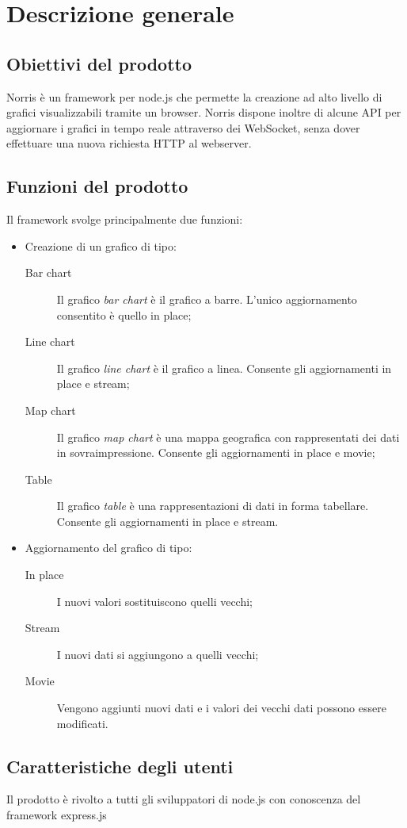 \section{Descrizione generale}


\subsection{Obiettivi del prodotto}
Norris è un framework per node.js che permette la creazione ad alto livello di grafici visualizzabili tramite un browser. Norris dispone inoltre di alcune API per aggiornare i grafici in tempo reale attraverso dei WebSocket, senza dover effettuare una nuova richiesta HTTP al webserver.


\subsection{Funzioni del prodotto}
Il framework svolge principalmente due funzioni:
\begin{itemize}
	\item Creazione di un grafico di tipo:
	\begin{description}
		\item[Bar chart] Il grafico \emph{bar chart} è il grafico a barre. L'unico aggiornamento consentito è quello in place;
		\item[Line chart] Il grafico \emph{line chart} è il grafico a linea. Consente gli aggiornamenti in place e stream;
		\item[Map chart] Il grafico \emph{map chart} è una mappa geografica con rappresentati dei dati in sovraimpressione. Consente gli aggiornamenti in place e movie;
		\item[Table] Il grafico \emph{table} è una rappresentazioni di dati in forma tabellare. Consente gli aggiornamenti in place e stream.
	\end{description}
	\item Aggiornamento del grafico di tipo:
	\begin{description}
		\item[In place] I nuovi valori sostituiscono quelli vecchi;
		\item[Stream] I nuovi dati si aggiungono a quelli vecchi;
		\item[Movie] Vengono aggiunti nuovi dati e i valori dei vecchi dati possono essere modificati.
	\end{description}
\end{itemize}


\subsection{Caratteristiche degli utenti}
Il prodotto è rivolto a tutti gli sviluppatori di node.js con conoscenza del framework express.js

